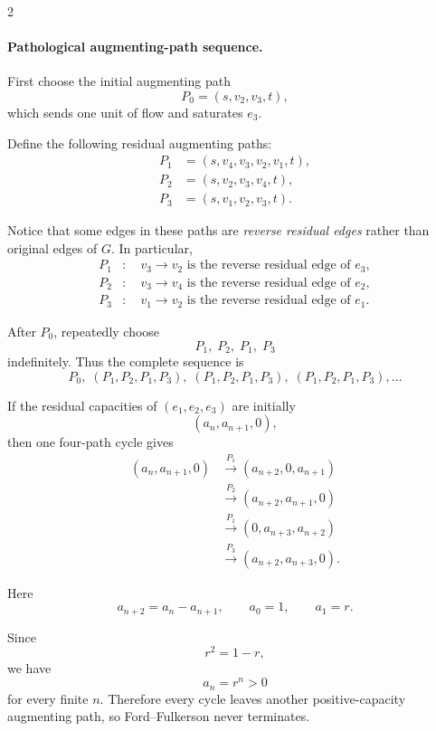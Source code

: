 \documentclass[8pt]{extarticle}
\theoremstyle{definition}
\begin{document}
\begin{multicols*}{2}
\begin{figure}[H]
\end{figure}

\paragraph{Pathological augmenting-path sequence.}

First choose the initial augmenting path
\[
P_0=(s,v_2,v_3,t),
\]
which sends one unit of flow and saturates $e_3$.

Define the following residual augmenting paths:
\begin{align*}
P_1 &= (s,v_4,v_3,v_2,v_1,t),\\
P_2 &= (s,v_2,v_3,v_4,t),\\
P_3 &= (s,v_1,v_2,v_3,t).
\end{align*}

Notice that some edges in these paths are
\emph{reverse residual edges} rather than original edges of $G$.
In particular,
\begin{align*}
P_1 &: \quad v_3 \to v_2
      \text{ is the reverse residual edge of }e_3,\\
P_2 &: \quad v_3 \to v_4
      \text{ is the reverse residual edge of }e_2,\\
P_3 &: \quad v_1 \to v_2
      \text{ is the reverse residual edge of }e_1.
\end{align*}

After $P_0$, repeatedly choose
\[
\boxed{
P_1,\;P_2,\;P_1,\;P_3
}
\]
indefinitely. Thus the complete sequence is
\[
\boxed{
P_0,\;
(P_1,P_2,P_1,P_3),\;
(P_1,P_2,P_1,P_3),\;
(P_1,P_2,P_1,P_3),\ldots
}
\]

If the residual capacities of $(e_1,e_2,e_3)$ are initially
\[
(a_n,a_{n+1},0),
\]
then one four-path cycle gives
\begin{align*}
(a_n,a_{n+1},0)
&\xrightarrow{P_1}
(a_{n+2},0,a_{n+1})\\
&\xrightarrow{P_2}
(a_{n+2},a_{n+1},0)\\
&\xrightarrow{P_1}
(0,a_{n+3},a_{n+2})\\
&\xrightarrow{P_3}
(a_{n+2},a_{n+3},0).
\end{align*}

Here
\[
a_{n+2}=a_n-a_{n+1},
\qquad
a_0=1,
\qquad
a_1=r.
\]

Since
\[
r^2=1-r,
\]
we have
\[
a_n=r^n>0
\]
for every finite $n$. Therefore every cycle leaves another
positive-capacity augmenting path, so Ford--Fulkerson never terminates.





\end{multicols*}
\end{document}

